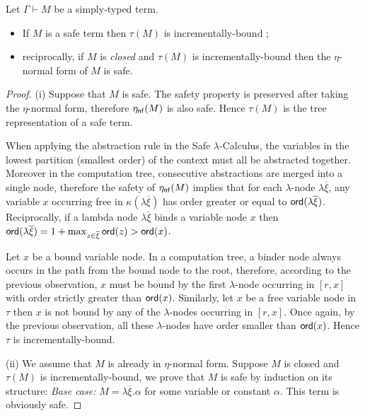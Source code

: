 \documentclass{llncs}
\newcommand\etanf[1]{\eta_{\sf nf}(#1)}
\newcommand\ord[1]{{\sf ord}(#1)}
\begin{document}
\begin{lemma}
\label{lem:safe_imp_incrbound} Let $\Gamma \vdash M$ be a
simply-typed term.
\begin{itemize}
\item[(i)] If $M$ is a safe term then $\tau(M)$ is incrementally-bound ;
\item[(ii)] reciprocally, if $M$ is \emph{closed} and $\tau(M)$ is incrementally-bound then the $\eta$-normal form of $M$ is safe.
\end{itemize}
\end{lemma}
\begin{proof}
(i) Suppose that $M$ is safe. The safety property is preserved after
taking the $\eta$-normal form, therefore $\etanf{M}$ is also safe.
Hence $\tau(M)$ is the tree representation of a safe term.

When applying the abstraction rule in the Safe $\lambda$-Calculus,
the variables in the lowest partition (smallest order) of the
context must all be abstracted together. Moreover in the computation
tree, consecutive abstractions are merged into a single node,
therefore the safety of $\etanf{M}$ implies that for each
$\lambda$-node $\lambda \overline{\xi}$, any variable $x$ occurring
free in $\kappa(\lambda \overline{\xi})$ has order greater or equal
to $\ord{\lambda \overline{\xi}}$. Reciprocally, if a lambda node
$\lambda \overline{\xi}$ binds a variable node $x$ then
$\ord{\lambda \overline{\xi}} = 1+\max_{z\in\overline{\xi}} \ord{z}
> \ord{x}$.

Let $x$ be a bound variable node. In a computation tree, a binder
node always occurs in the path from the bound node to the root,
therefore, according to the previous observation, $x$ must be bound
by the first $\lambda$-node occurring in $[r,x]$ with order strictly
greater than $\ord{x}$. Similarly, let $x$ be a free variable node
in $\tau$ then $x$ is not bound by any of the $\lambda$-nodes
occurring in $[r,x]$. Once again, by the previous observation, all
these $\lambda$-nodes have order smaller than $\ord{x}$. Hence
$\tau$ is incrementally-bound.

(ii) We assume that $M$ is already in $\eta$-normal form. Suppose
$M$ is closed and $\tau(M)$ is incrementally-bound, we prove that
$M$ is safe by induction on its structure: \emph{Base case:} $M =
\lambda \overline{\xi} . \alpha$ for some variable or constant
$\alpha$. This term is obviously safe.


\end{proof}
\end{document}
